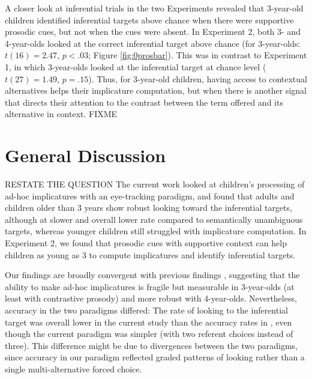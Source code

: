 \documentclass[10pt,letterpaper]{article}
\begin{document}
A closer look at inferential trials in the two Experiments revealed that 3-year-old children identified inferential targets above chance when there were supportive prosodic cues, but not when the cues were absent. In Experiment 2, both 3- and 4-year-olds looked at the correct inferential target above chance (for 3-year-olds: $t(16) = 2.47$, $p < .03$; Figure \ref{fig:0prosbar}). This was in contrast to Experiment 1, in which 3-year-olds looked at the inferential target at chance level ($t(27) = 1.49$, $p = .15$). Thus, for 3-year-old children, having access to contextual alternatives helps their implicature computation, but when there is another signal that directs their attention to the contrast between the term offered and its alternative in context. FIXME

\section{General Discussion}

RESTATE THE QUESTION The current work looked at children's processing of ad-hoc implicatures with an eye-tracking paradigm, and found that adults and children older than 3 years show robust looking toward the inferential targets, although at slower and overall lower rate compared to semantically unambiguous targets, whereas younger children still struggled with implicature computation. In Experiment 2, we found that prosodic cues with supportive context can help children as young as 3 to compute implicatures and identify inferential targets.

Our findings are broadly convergent with previous findings \cite{stillerLLD}, suggesting that the ability to make ad-hoc implicatures is fragile but measurable in 3-year-olds (at least with contrastive prosody) and more robust with 4-year-olds. Nevertheless, accuracy in the two paradigms differed: The rate of looking to the inferential target was overall lower in the current study than the accuracy rates in , even though the current paradigm was simpler (with two referent choices instead of three). This difference might be due to divergences between the two paradigms, since accuracy in our paradigm reflected graded patterns of looking rather than a single multi-alternative forced choice. 
\end{document}
